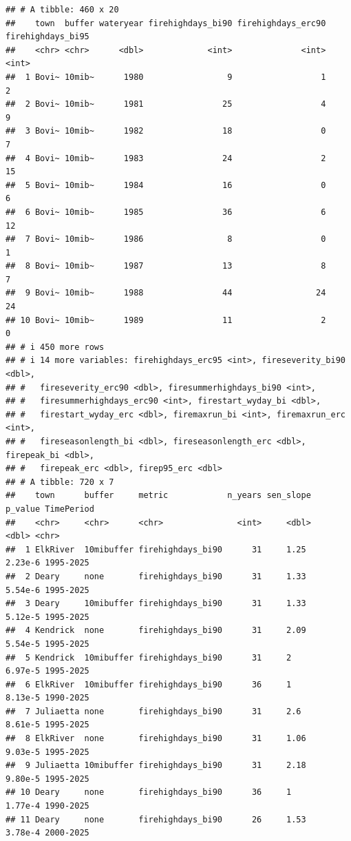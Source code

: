 \documentclass[
]{article}
\begin{document}
\begin{verbatim}
## # A tibble: 460 x 20
##    town  buffer wateryear firehighdays_bi90 firehighdays_erc90 firehighdays_bi95
##    <chr> <chr>      <dbl>             <int>              <int>             <int>
##  1 Bovi~ 10mib~      1980                 9                  1                 2
##  2 Bovi~ 10mib~      1981                25                  4                 9
##  3 Bovi~ 10mib~      1982                18                  0                 7
##  4 Bovi~ 10mib~      1983                24                  2                15
##  5 Bovi~ 10mib~      1984                16                  0                 6
##  6 Bovi~ 10mib~      1985                36                  6                12
##  7 Bovi~ 10mib~      1986                 8                  0                 1
##  8 Bovi~ 10mib~      1987                13                  8                 7
##  9 Bovi~ 10mib~      1988                44                 24                24
## 10 Bovi~ 10mib~      1989                11                  2                 0
## # i 450 more rows
## # i 14 more variables: firehighdays_erc95 <int>, fireseverity_bi90 <dbl>,
## #   fireseverity_erc90 <dbl>, firesummerhighdays_bi90 <int>,
## #   firesummerhighdays_erc90 <int>, firestart_wyday_bi <dbl>,
## #   firestart_wyday_erc <dbl>, firemaxrun_bi <int>, firemaxrun_erc <int>,
## #   fireseasonlength_bi <dbl>, fireseasonlength_erc <dbl>, firepeak_bi <dbl>,
## #   firepeak_erc <dbl>, firep95_erc <dbl>
## # A tibble: 720 x 7
##    town      buffer     metric            n_years sen_slope   p_value TimePeriod
##    <chr>     <chr>      <chr>               <int>     <dbl>     <dbl> <chr>     
##  1 ElkRiver  10mibuffer firehighdays_bi90      31     1.25    2.23e-6 1995-2025 
##  2 Deary     none       firehighdays_bi90      31     1.33    5.54e-6 1995-2025 
##  3 Deary     10mibuffer firehighdays_bi90      31     1.33    5.12e-5 1995-2025 
##  4 Kendrick  none       firehighdays_bi90      31     2.09    5.54e-5 1995-2025 
##  5 Kendrick  10mibuffer firehighdays_bi90      31     2       6.97e-5 1995-2025 
##  6 ElkRiver  10mibuffer firehighdays_bi90      36     1       8.13e-5 1990-2025 
##  7 Juliaetta none       firehighdays_bi90      31     2.6     8.61e-5 1995-2025 
##  8 ElkRiver  none       firehighdays_bi90      31     1.06    9.03e-5 1995-2025 
##  9 Juliaetta 10mibuffer firehighdays_bi90      31     2.18    9.80e-5 1995-2025 
## 10 Deary     none       firehighdays_bi90      36     1       1.77e-4 1990-2025 
## 11 Deary     none       firehighdays_bi90      26     1.53    3.78e-4 2000-2025 

\end{verbatim}
\end{document}
